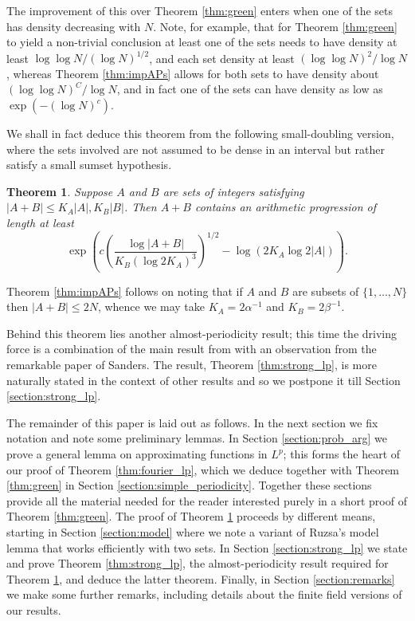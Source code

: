 \documentclass[12pt,a4paper,reqno]{amsart}
\numberwithin{equation}{section}
\theoremstyle{plain}
\newtheorem{theorem}[subsection]{Theorem}
\theoremstyle{definition}
\renewcommand{\leq}{\leqslant}
\providecommand{\abs}[1]{\lvert#1\rvert}
\theoremstyle{plain}
\begin{document}
The improvement of this over Theorem \ref{thm:green} enters when one of the sets has density decreasing with $N$. Note, for example, that for Theorem \ref{thm:green} to yield a non-trivial conclusion at least one of the sets needs to have density at least $\log \log N/(\log N)^{1/2}$, and each set density at least $(\log \log N)^2/\log N$, whereas Theorem \ref{thm:impAPs} allows for both sets to have density about $(\log \log N)^C/\log N$, and in fact one of the sets can have density as low as $\exp\left(- (\log N)^{c}\right)$.

We shall in fact deduce this theorem from the following small-doubling version, where the sets involved are not assumed to be dense in an interval but rather satisfy a small sumset hypothesis.

\begin{theorem}\label{thm:impAPsDoubling}
Suppose $A$ and $B$ are sets of integers satisfying $\abs{A+B} \leq K_A\abs{A}, K_B\abs{B}$. Then $A+B$ contains an arithmetic progression of length at least
\[ \exp\left( c \left(\frac{\log{\abs{A+B}}}{K_B (\log 2K_A)^3} \right)^{1/2} - \log(2K_A\log{2\abs{A}}) \right). \]
\end{theorem}

Theorem \ref{thm:impAPs} follows on noting that if $A$ and $B$ are subsets of $\{1,\ldots,N\}$ then $\abs{A+B} \leq 2N$, whence we may take $K_A = 2\alpha^{-1}$ and $K_B = 2\beta^{-1}$. 

Behind this theorem lies another almost-periodicity result; this time the driving force is a combination of the main result from \cite{croot-sisask} with an observation from the remarkable paper \cite{sanders:bogolyubov} of Sanders. The result, Theorem \ref{thm:strong_lp}, is more naturally stated in the context of other results and so we postpone it till Section \ref{section:strong_lp}.

The remainder of this paper is laid out as follows. In the next section we fix notation and note some preliminary lemmas. In Section \ref{section:prob_arg} we prove a general lemma on approximating functions in $L^p$; this forms the heart of our proof of Theorem \ref{thm:fourier_lp}, which we deduce together with Theorem \ref{thm:green} in Section \ref{section:simple_periodicity}. Together these sections provide all the material needed for the reader interested purely in a short proof of Theorem \ref{thm:green}. The proof of Theorem \ref{thm:impAPsDoubling} proceeds by different means, starting in Section \ref{section:model} where we note a variant of Ruzsa's model lemma that works efficiently with two sets. In Section \ref{section:strong_lp} we state and prove Theorem \ref{thm:strong_lp}, the almost-periodicity result required for Theorem \ref{thm:impAPsDoubling}, and deduce the latter theorem. Finally, in Section \ref{section:remarks} we make some further remarks, including details about the finite field versions of our results.
\end{document}
